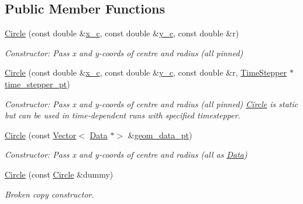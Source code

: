\subsection*{Public Member Functions}
\begin{DoxyCompactItemize}
\item 
\hyperlink{classoomph_1_1Circle_ac15caf288929071b5561309771e4e0f0}{Circle} (const double \&\hyperlink{classoomph_1_1Circle_a8245cf2cbeb6ff6bf5a11fa9ac56660b}{x\+\_\+c}, const double \&\hyperlink{classoomph_1_1Circle_a0a08b85aa06f6b4312f40f143a11a70b}{y\+\_\+c}, const double \&r)
\begin{DoxyCompactList}\small\item\em Constructor\+: Pass x and y-\/coords of centre and radius (all pinned) \end{DoxyCompactList}\item 
\hyperlink{classoomph_1_1Circle_a46c490c634039dc63c7eea5927b77c1c}{Circle} (const double \&\hyperlink{classoomph_1_1Circle_a8245cf2cbeb6ff6bf5a11fa9ac56660b}{x\+\_\+c}, const double \&\hyperlink{classoomph_1_1Circle_a0a08b85aa06f6b4312f40f143a11a70b}{y\+\_\+c}, const double \&r, \hyperlink{classoomph_1_1TimeStepper}{Time\+Stepper} $\ast$\hyperlink{classoomph_1_1GeomObject_a3c92023891dd4a0e818022f467eeb7f1}{time\+\_\+stepper\+\_\+pt})
\begin{DoxyCompactList}\small\item\em Constructor\+: Pass x and y-\/coords of centre and radius (all pinned) \hyperlink{classoomph_1_1Circle}{Circle} is static but can be used in time-\/dependent runs with specified timestepper. \end{DoxyCompactList}\item 
\hyperlink{classoomph_1_1Circle_a0a173fef925b4df6ca86d65a57de06c7}{Circle} (const \hyperlink{classoomph_1_1Vector}{Vector}$<$ \hyperlink{classoomph_1_1Data}{Data} $\ast$$>$ \&\hyperlink{classoomph_1_1Circle_ab48e086bc4f484e155ebb2edd6e90040}{geom\+\_\+data\+\_\+pt})
\begin{DoxyCompactList}\small\item\em Constructor\+: Pass x and y-\/coords of centre and radius (all as \hyperlink{classoomph_1_1Data}{Data}) \end{DoxyCompactList}\item 
\hyperlink{classoomph_1_1Circle_a3fcb41fc1728459d3a669674921082e5}{Circle} (const \hyperlink{classoomph_1_1Circle}{Circle} \&dummy)
\begin{DoxyCompactList}\small\item\em Broken copy constructor. \end{DoxyCompactList}\item 
$$
\end{DoxyCompactItemize}
